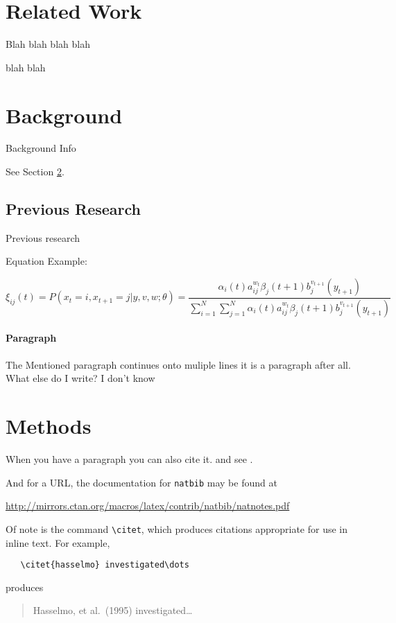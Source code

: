\documentclass{article}
\begin{document}
\section{Related Work}

Blah blah blah blah\par

blah blah


\section{Background}
\label{sec:headings}

Background Info \par
See Section \ref{sec:headings}.

\subsection{Previous Research}
Previous research \par
Equation Example: \newline

\begin{equation}
\xi _{ij}(t)=P(x_{t}=i,x_{t+1}=j|y,v,w;\theta)= {\frac {\alpha _{i}(t)a^{w_t}_{ij}\beta _{j}(t+1)b^{v_{t+1}}_{j}(y_{t+1})}{\sum _{i=1}^{N} \sum _{j=1}^{N} \alpha _{i}(t)a^{w_t}_{ij}\beta _{j}(t+1)b^{v_{t+1}}_{j}(y_{t+1})}}
\end{equation}


\paragraph{Paragraph}
The Mentioned paragraph continues onto muliple lines it is a paragraph after all. What else do I write? I don't know

\section{Methods}
\label{sec:others}
When you have a paragraph you can also cite it. \cite{8662581} and see \cite{inbook}.

And for a URL, the documentation for \verb+natbib+ may be found at
\begin{center}
  \url{http://mirrors.ctan.org/macros/latex/contrib/natbib/natnotes.pdf}
\end{center}
Of note is the command \verb+\citet+, which produces citations
appropriate for use in inline text.  For example, 
\begin{verbatim}
   \citet{hasselmo} investigated\dots
\end{verbatim}
produces
\begin{quote}
  Hasselmo, et al.\ (1995) investigated\dots
\end{quote}
\end{document}
